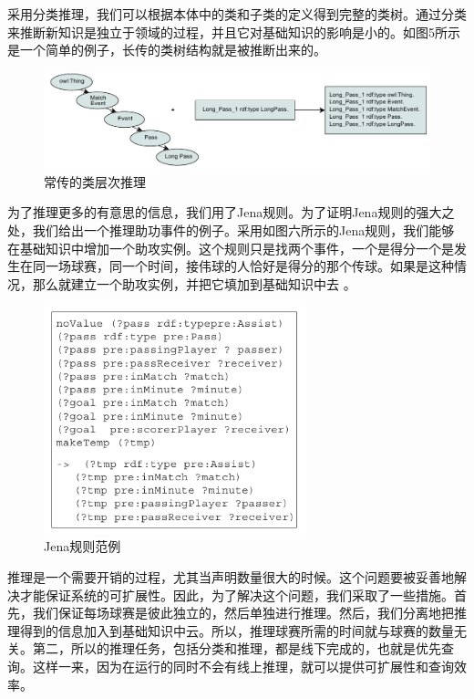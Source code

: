 采用分类推理，我们可以根据本体中的类和子类的定义得到完整的类树。通过分类来推断新知识是独立于领域的过程，并且它对基础知识的影响是小的。如图5所示是一个简单的例子，长传的类树结构就是被推断出来的。

	\begin{figure}[htbp] 
	\centering\includegraphics[width=6in]{fig/trans/fig5.png} 
	\caption[]{\xiaosihao 常传的类层次推理}
	\end{figure} 

为了推理更多的有意思的信息，我们用了{\Times Jena}规则。为了证明{\Times Jena}规则的强大之处，我们给出一个推理助功事件的例子。采用如图六所示的{\Times Jena}规则，我们能够在基础知识中增加一个助攻实例。这个规则只是找两个事件，一个是得分一个是发生在同一场球赛，同一个时间，接伟球的人恰好是得分的那个传球。如果是这种情况，那么就建立一个助攻实例，并把它填加到基础知识中去 。

	\begin{figure}[htbp] 
	\centering\includegraphics[width=3in]{fig/trans/fig6.png} 
	\caption[]{\xiaosihao Jena规则范例}
	\end{figure} 

推理是一个需要开销的过程，尤其当声明数量很大的时候。这个问题要被妥善地解决才能保证系统的可扩展性。因此，为了解决这个问题，我们采取了一些措施。首先，我们保证每场球赛是彼此独立的，然后单独进行推理。然后，我们分离地把推理得到的信息加入到基础知识中云。所以，推理球赛所需的时间就与球赛的数量无关。第二，所以的推理任务，包括分类和推理，都是线下完成的，也就是优先查询。这样一来，因为在运行的同时不会有线上推理，就可以提供可扩展性和查询效率。

